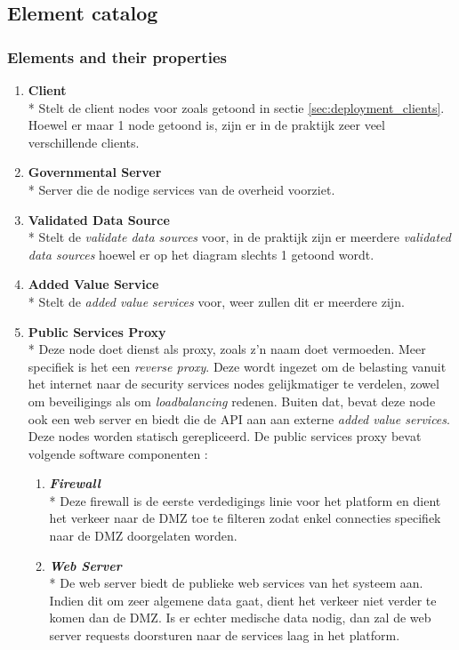 \documentclass[a4paper,10pt]{article}
\begin{document}
\subsection{Element catalog}

\subsubsection*{Elements and their properties}
\begin{enumerate}
 \item \textbf{Client}\\*
Stelt de client nodes voor zoals getoond in sectie \ref{sec:deployment_clients}. Hoewel er maar 1 node getoond is, zijn er in de praktijk zeer veel verschillende clients.
\item \textbf{Governmental Server}\\*
Server die de nodige services van de overheid voorziet.
\item \textbf{Validated Data Source}\\*
Stelt de \textit{validate data sources} voor, in de praktijk zijn er meerdere \textit{validated data sources} hoewel er op het diagram slechts 1 getoond wordt.
\item \textbf{Added Value Service}\\*
Stelt de \textit{added value services} voor, weer zullen dit er meerdere zijn.
\item \textbf{Public Services Proxy}\\*
Deze node doet dienst als proxy, zoals z'n naam doet vermoeden. Meer specifiek is het een \textit{reverse proxy}. Deze wordt ingezet om de belasting vanuit het internet naar de security services nodes gelijkmatiger te verdelen, zowel om beveiligings als om \textit{loadbalancing} redenen. Buiten dat, bevat deze node ook een web server en biedt die de API aan aan externe \textit{added value services}. Deze nodes worden statisch gerepliceerd. De public services proxy bevat volgende software componenten : 
\begin{enumerate}
 \item \textit{\textbf{Firewall}}\\*
 Deze firewall is de eerste verdedigings linie voor het platform en dient het verkeer naar de DMZ toe te filteren zodat enkel connecties specifiek naar de DMZ doorgelaten worden.
\item \textit{\textbf{Web Server}}\\*
De web server biedt de publieke web services van het systeem aan. Indien dit om zeer algemene data gaat, dient het verkeer niet verder te komen dan de DMZ. Is er echter medische data nodig, dan zal de web server requests doorsturen naar de services laag in het platform.

\end{enumerate}
\end{enumerate}
\end{document}
